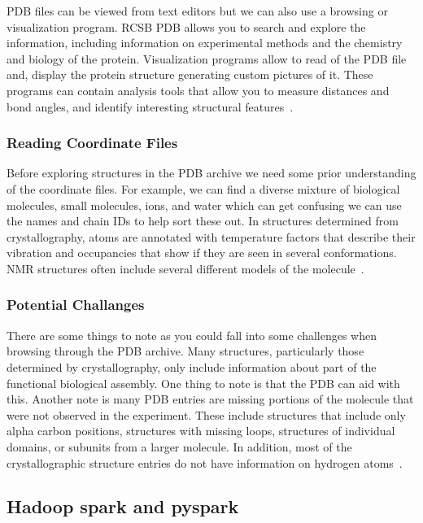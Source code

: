 \documentclass[]{final_report}
\begin{document}
PDB files can be viewed from text editors but we can also use a browsing or visualization program. RCSB PDB allows you to search and explore the information, including information on experimental methods and the chemistry and biology of the protein. Visualization programs allow to read of the PDB file and, display the protein structure generating custom pictures of it. These programs can contain analysis tools that allow you to measure distances and bond angles, and identify interesting structural features~\cite{noauthor_pdb101_nodate}.

\subsubsection{Reading Coordinate Files}

Before exploring structures in the PDB archive we need some prior understanding of the coordinate files. For example, we can find a diverse mixture of biological molecules, small molecules, ions, and water which can get confusing we can use the names and chain IDs to help sort these out. In structures determined from crystallography, atoms are annotated with temperature factors that describe their vibration and occupancies that show if they are seen in several conformations. NMR structures often include several different models of the molecule~\cite{noauthor_pdb101_nodate}.

\subsubsection{Potential Challanges}

There are some things to note as you could fall into some challenges when browsing through the PDB archive. Many structures, particularly those determined by crystallography, only include information about part of the functional biological assembly. One thing to note is that the PDB can aid with this. Another note is many PDB entries are missing portions of the molecule that were not observed in the experiment. These include structures that include only alpha carbon positions, structures with missing loops, structures of individual domains, or subunits from a larger molecule. In addition, most of the crystallographic structure entries do not have information on hydrogen atoms~\cite{noauthor_pdb101_nodate}.

\subsection{Hadoop spark and pyspark}
\end{document}
